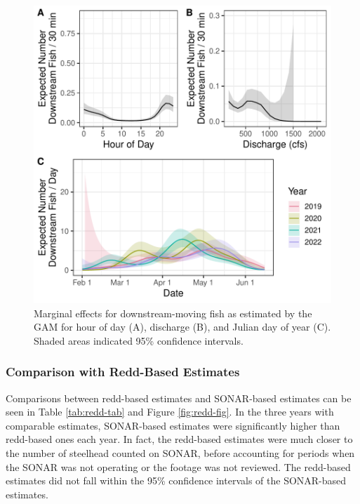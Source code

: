 \documentclass[
]{article}
\begin{document}
\begin{figure}
\centering
\includegraphics{../figures/down-marg-1.pdf}
\caption{\label{fig:down-marg}Marginal effects for downstream-moving fish as estimated by the GAM for hour of day (A), discharge (B), and Julian day of year (C). Shaded areas indicated 95\% confidence intervals.}
\end{figure}

\FloatBarrier

\hypertarget{comparison-with-redd-based-estimates-1}{%
\subsubsection{Comparison with Redd-Based Estimates}\label{comparison-with-redd-based-estimates-1}}

Comparisons between redd-based estimates and SONAR-based estimates can be seen in Table \ref{tab:redd-tab} and Figure \ref{fig:redd-fig}. In the three years with comparable estimates, SONAR-based estimates were significantly higher than redd-based ones each year. In fact, the redd-based estimates were much closer to the number of steelhead counted on SONAR, before accounting for periods when the SONAR was not operating or the footage was not reviewed. The redd-based estimates did not fall within the 95\% confidence intervals of the SONAR-based estimates.
\end{document}
